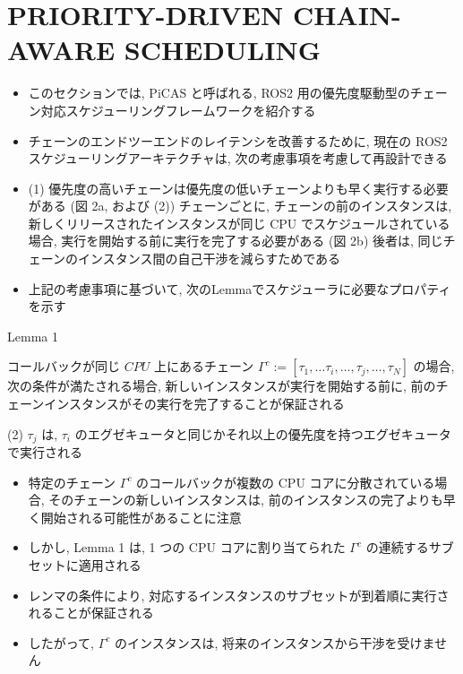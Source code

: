 
\section{PRIORITY-DRIVEN CHAIN-AWARE SCHEDULING}
\label{sec: priority-driven chain-aware scheduling}

\begin{frame}{}
    \begin{itemize}
        \item このセクションでは, PiCAS と呼ばれる, ROS2 用の優先度駆動型のチェーン対応スケジューリングフレームワークを紹介する
        \item チェーンのエンドツーエンドのレイテンシを改善するために, 現在の ROS2 スケジューリングアーキテクチャは, 次の考慮事項を考慮して再設計できる
        \item (1) 優先度の高いチェーンは優先度の低いチェーンよりも早く実行する必要がある (図 2a, および (2)) チェーンごとに, チェーンの前のインスタンスは, 新しくリリースされたインスタンスが同じ CPU でスケジュールされている場合, 実行を開始する前に実行を完了する必要がある (図 2b) 後者は, 同じチェーンのインスタンス間の自己干渉を減らすためである
        \item 上記の考慮事項に基づいて, 次のLemmaでスケジューラに必要なプロパティを示す
    \end{itemize}
\end{frame}

\begin{frame}[label=lemma1]{Lemma 1}
    \begin{lemma}[]
        コールバックが同じ $C P U$ 上にあるチェーン $\Gamma^{c}:=\left[\tau_{1}, \ldots \tau_{i}, \ldots, \tau_{j}, \ldots, \tau_{N}\right]$ の場合, 次の条件が満たされる場合, 新しいインスタンスが実行を開始する前に, 前のチェーンインスタンスがその実行を完了することが保証される
        \item (2) $\tau_{j}$ は,  $\tau_{i}$ のエグゼキュータと同じかそれ以上の優先度を持つエグゼキュータで実行される
    \end{lemma}
\end{frame}

\begin{frame}{}
    \begin{itemize}
        \item 特定のチェーン $\Gamma^{c}$ のコールバックが複数の CPU コアに分散されている場合, そのチェーンの新しいインスタンスは, 前のインスタンスの完了よりも早く開始される可能性があることに注意
        \item しかし, Lemma 1 は, 1 つの CPU コアに割り当てられた $\Gamma^{c}$ の連続するサブセットに適用される
        \item レンマの条件により, 対応するインスタンスのサブセットが到着順に実行されることが保証される
        \item したがって, $\Gamma^{c}$ のインスタンスは, 将来のインスタンスから干渉を受けません
    \end{itemize}
\end{frame}

